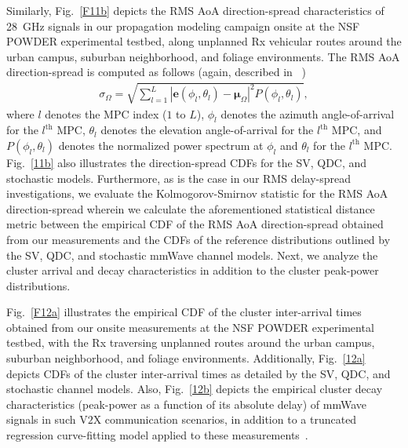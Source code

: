 \documentclass[12pt, draftcls, onecolumn]{IEEEtran}
\begin{document}
{Similarly, Fig.~\ref{F11b} depicts the RMS AoA direction-spread characteristics of \SI{28}{\giga\hertz} signals in our propagation modeling campaign onsite at the NSF POWDER experimental testbed, along unplanned Rx vehicular routes around the urban campus, suburban neighborhood, and foliage environments. The RMS AoA direction-spread is computed as follows (again, described in ~\cite{Indoor60G})
\begin{align}\label{RMS_DirS}
    \sigma_{\Omega} = \sqrt{\sum_{l=1}^{L}|\mathbf{e}(\phi_{l}, \theta_{l}) - \boldsymbol{\mu}_{\Omega}|^{2}P(\phi_{l}, \theta_{l})},
\end{align}
where $l$ denotes the MPC index ($1$ to $L$), $\phi_{l}$ denotes the azimuth angle-of-arrival for the $l^{\mathrm{th}}$ MPC, $\theta_{l}$ denotes the elevation angle-of-arrival for the $l^{\mathrm{th}}$ MPC, and $P(\phi_{l}, \theta_{l})$ denotes the normalized power spectrum at $\phi_{l}$ and $\theta_{l}$ for the $l^{\mathrm{th}}$ MPC. Fig.~\ref{11b} also illustrates the direction-spread CDFs for the SV, QDC, and stochastic models. Furthermore, as is the case in our RMS delay-spread investigations, we evaluate the Kolmogorov-Smirnov statistic for the RMS AoA direction-spread wherein we calculate the aforementioned statistical distance metric between the empirical CDF of the RMS AoA direction-spread obtained from our measurements and the CDFs of the reference distributions outlined by the SV, QDC, and stochastic mmWave channel models. Next, we analyze the cluster arrival and decay characteristics in addition to the cluster peak-power distributions.

Fig.~\ref{F12a} illustrates the empirical CDF of the cluster inter-arrival times obtained from our onsite measurements at the NSF POWDER experimental testbed, with the Rx traversing unplanned routes around the urban campus, suburban neighborhood, and foliage environments. Additionally, Fig.~\ref{12a} depicts CDFs of the cluster inter-arrival times as detailed by the SV, QDC, and stochastic channel models. Also, Fig.~\ref{12b} depicts the empirical cluster decay characteristics (peak-power as a function of its absolute delay) of mmWave signals in such V$2$X communication scenarios, in addition to a truncated regression curve-fitting model applied to these measurements~\cite{Indoor60G}.

}
\end{document}
